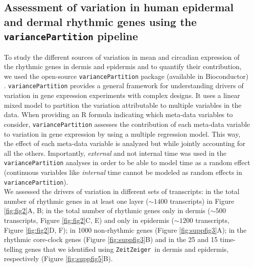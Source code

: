 \subsection*{Assessment of variation in human epidermal and dermal rhythmic genes using the \texttt{variancePartition} pipeline}
To study the different sources of variation in mean and circadian expression of the rhythmic genes in dermis and epidermis and to quantify their contribution, we used the open-source \texttt{variancePartition} package (available in Bioconductor) \cite{Hoffman2016}. \texttt{variancePartition} provides a general framework for understanding drivers of variation in gene expression experiments with complex designs. It uses a linear mixed model to partition the variation attributable to multiple variables in the data. When providing an R formula indicating which meta-data variables to consider, \texttt{variancePartition} assesses the contribution of each meta-data variable to variation in gene expression by using a multiple regression model. This way, the effect of each meta-data variable is analyzed but while jointly accounting for all the others. Importantly, \textit{external} and not internal time was used in the \texttt{variancePartition} analyses in order to be able to model time as a random effect (continuous variables like \textit{internal} time cannot be modeled as random effects in \texttt{variancePartition}). \\

We assessed the drivers of variation in different sets of transcripts: in the total number of rhythmic genes in at least one layer ($\sim1400$ transcripts) in Figure \ref{fig:fig2}A, B; in the total number of rhythmic genes only in dermis ($\sim500$ transcripts, Figure \ref{fig:fig2}C, E) and only in epidermis ($\sim1200$ transcripts, Figure \ref{fig:fig2}D, F); in 1000 non-rhythmic genes (Figure \ref{fig:suppfig3}A); in the rhythmic core-clock genes (Figure \ref{fig:suppfig3}B) and in the 25 and 15 time-telling genes that we identified using \texttt{ZeitZeiger }in dermis and epidermis, respectively (Figure \ref{fig:suppfig5}B).

